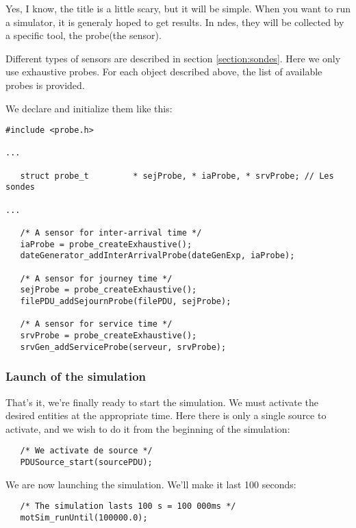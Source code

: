    
   Yes, I know, the title is a little scary, but it will be simple. 
When you want to run a simulator, it is generaly hoped to get results.
   In {\sc ndes}, they will be collected by a specific tool, the probe(the sensor).

   Different types of sensors are described in section \ref{section:sondes}.
   Here we only use exhaustive probes. For each object described above, the list of available probes is provided.   

   We declare and initialize them like this:   

\begin{verbatim}
#include <probe.h>

...

   struct probe_t         * sejProbe, * iaProbe, * srvProbe; // Les sondes

...

   /* A sensor for inter-arrival time */
   iaProbe = probe_createExhaustive();
   dateGenerator_addInterArrivalProbe(dateGenExp, iaProbe);

   /* A sensor for journey time */
   sejProbe = probe_createExhaustive();
   filePDU_addSejournProbe(filePDU, sejProbe);

   /* A sensor for service time */
   srvProbe = probe_createExhaustive();
   srvGen_addServiceProbe(serveur, srvProbe);
\end{verbatim}

%
\subsubsection{Launch of the simulation}
   
   
   That's it, we're finally ready to start the
simulation. We must activate the desired entities at the appropriate
time. Here there is only a single source to activate, and we wish
to do it from the beginning of the simulation:


\begin{verbatim}
   /* We activate de source */
   PDUSource_start(sourcePDU);
\end{verbatim}

   We are now launching the simulation. We'll make it last
100 seconds:

\begin{verbatim}
   /* The simulation lasts 100 s = 100 000ms */
   motSim_runUntil(100000.0);
\end{verbatim}

